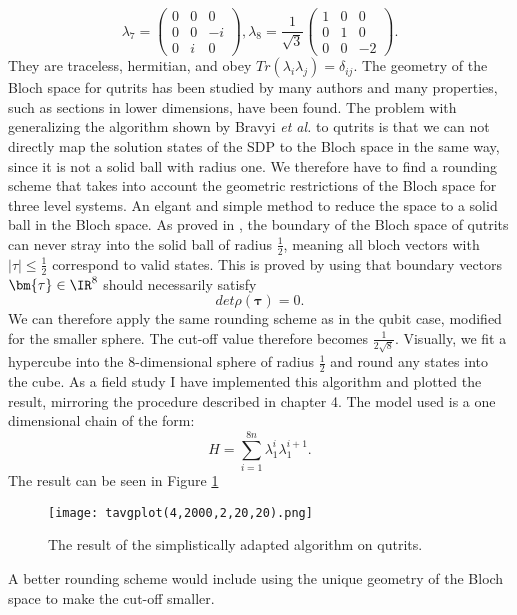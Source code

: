 \[
\lambda_7=\begin{pmatrix} 0 & 0 & 0 \\ 0 & 0 & -i \\ 0 & i & 0 \end{pmatrix},
\lambda_8=\frac{1}{\sqrt{3}} \begin{pmatrix} 1 & 0 & 0 \\ 0 & 1 & 0 \\ 0 & 0 & -2 \end{pmatrix}
.\]
They are traceless, hermitian, and obey $Tr\left(\lambda_i\lambda_j\right)=\delta_{ij}$.
The geometry of the Bloch space for qutrits has been studied by many authors \cite{mendas06,goyal16,kimura03} and many properties, such as sections in lower dimensions, have been found.
The problem with generalizing the algorithm shown by Bravyi \emph{et al.} to qutrits is that we can not directly map the solution states of the SDP to the Bloch space in the same way, since it is not a solid ball with radius one.
We therefore have to find a rounding scheme that takes into account the geometric restrictions of the Bloch space for three level systems.
An elgant and simple method to reduce the space to a solid ball in the Bloch space.
As proved in \cite{goyal16}, the boundary of the Bloch space of qutrits can never stray into the solid ball of radius $\frac{1}{2}$, meaning all bloch vectors with $ \left| \tau \right| \le \frac{1}{2}$ correspond to valid states.
This is proved by using that boundary vectors $\bm{\tau}\in\IR^{8}$ should necessarily satisfy \[
	det \rho(\bm{\tau}) = 0
.\]
We can therefore apply the same rounding scheme as in the qubit case, modified for the smaller sphere.
The cut-off value therefore becomes $\frac{1}{2\sqrt{8}}$.
Visually, we fit a hypercube into the $8$-dimensional sphere of radius $\frac{1}{2}$ and round any states into the cube.
As a field study I have implemented this algorithm and plotted the result, mirroring the procedure described in chapter 4.
The model used is a one dimensional chain of the form: \[
H = \sum_{i=1}^{8n}\lambda_1^{i}\lambda_1^{i+1}
.\]
The result can be seen in Figure \ref{fig:4}
\begin{figure}[H]
	\centering
	\texttt{[image: tavgplot(4,2000,2,20,20).png]}
	\caption{The result of the simplistically adapted algorithm on qutrits.}
	\label{fig:4}
\end{figure}
\noindent A better rounding scheme would include using the unique geometry of the Bloch space to make the cut-off smaller.
